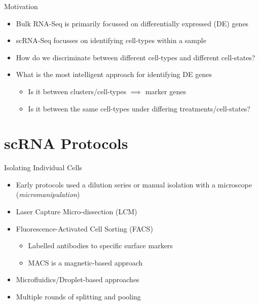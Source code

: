 \documentclass[aspectratio=169,11pt]{beamer}
\begin{document}
\begin{frame}{Motivation}

	\begin{itemize}
		\item Bulk RNA-Seq is primarily focussed on differentially expressed (DE) genes
		\item scRNA-Seq focusses on identifying cell-types within a sample
		\item How do we discriminate between different cell-types and different cell-states?
		\item What is the most intelligent approach for identifying DE genes\\[2mm]
		\begin{itemize}
			\item Is it between clusters/cell-types $\implies$ marker genes
			\item Is it between the same cell-types under differing treatments/cell-states?
		\end{itemize}
	\end{itemize}

\end{frame}

\section{scRNA Protocols}

\begin{frame}{Isolating Individual Cells}

	\begin{itemize}
		\item Early protocols used a dilution series or manual isolation with a microscope (\textit{micromanipulation})
		\item Laser Capture Micro-dissection (LCM)
		\item Fluorescence-Activated Cell Sorting (FACS)
		\begin{itemize}
			\item Labelled antibodies to specific surface markers 
			\item MACS is a magnetic-based approach
		\end{itemize}
		\item Microfluidics/Droplet-based approaches
		\item Multiple rounds of splitting and pooling
	\end{itemize}

\end{frame}
\end{document}
